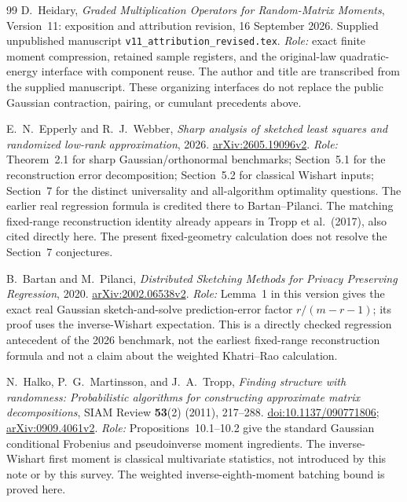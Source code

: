 \documentclass[11pt]{article}
\numberwithin{equation}{section}
\theoremstyle{definition}\newtheorem{definition}[theorem]{Definition}
\theoremstyle{remark}\newtheorem{remark}[theorem]{Remark}
\begin{document}
\begin{thebibliography}{99}
D.~Heidary,
\emph{Graded Multiplication Operators for Random-Matrix Moments},
Version~11: exposition and attribution revision, 16 September 2026.
Supplied unpublished manuscript \texttt{v11\_attribution\_revised.tex}.
\textit{Role:} exact finite moment compression, retained sample registers, and the
original-law quadratic-energy interface with component reuse. The author and title are
transcribed from the supplied manuscript. These organizing interfaces do not
replace the public Gaussian contraction, pairing, or cumulant precedents above.

E.~N.~Epperly and R.~J.~Webber,
\emph{Sharp analysis of sketched least squares and randomized low-rank approximation},
2026. \href{https://arxiv.org/abs/2605.19096v2}{arXiv:2605.19096v2}.
\textit{Role:} Theorem~2.1 for sharp Gaussian/orthonormal benchmarks;
Section~5.1 for the reconstruction error decomposition; Section~5.2 for
classical Wishart inputs; Section~7 for the distinct universality and
all-algorithm optimality questions. The earlier real regression formula is
credited there to Bartan--Pilanci. The matching fixed-range reconstruction
identity already appears in Tropp et al.\ (2017), also cited directly here. The present
fixed-geometry calculation does not resolve the Section~7 conjectures.

B.~Bartan and M.~Pilanci,
\emph{Distributed Sketching Methods for Privacy Preserving Regression},
2020. \href{https://arxiv.org/abs/2002.06538v2}{arXiv:2002.06538v2}.
\textit{Role:} Lemma~1 in this version gives the exact real Gaussian
sketch-and-solve prediction-error factor $r/(m-r-1)$; its proof uses the
inverse-Wishart expectation. This is a directly checked regression antecedent of the
2026 benchmark, not the earliest fixed-range reconstruction formula and not a
claim about the weighted Khatri--Rao calculation.

N.~Halko, P.~G.~Martinsson, and J.~A.~Tropp,
\emph{Finding structure with randomness: Probabilistic algorithms for
constructing approximate matrix decompositions},
SIAM Review \textbf{53}(2) (2011), 217--288.
\href{https://doi.org/10.1137/090771806}{doi:10.1137/090771806};
\href{https://arxiv.org/abs/0909.4061v2}{arXiv:0909.4061v2}.
\textit{Role:} Propositions~10.1--10.2 give the standard Gaussian conditional
Frobenius and pseudoinverse moment ingredients. The inverse-Wishart first
moment is classical multivariate statistics, not introduced by this note or
by this survey. The weighted inverse-eighth-moment batching bound is proved here.



\end{thebibliography}
\end{document}
